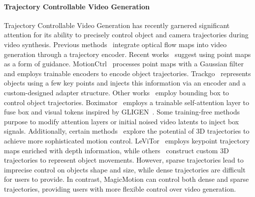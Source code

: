 \paragraph{Trajectory Controllable Video Generation}
Trajectory Controllable Video Generation has recently garnered significant attention for its ability to precisely control object and camera trajectories during video synthesis.
Previous methods~\cite{yin2023dragnuwa, zhang2025tora, shi2024motion, li2025image}
integrate optical flow maps into video generation through a trajectory encoder.
Recent works~\cite{wang2024motionctrl, zhou2025trackgo} suggest using point maps as a form of guidance.
MotionCtrl~\cite{wang2024motionctrl} processes point maps with a Gaussian filter and employs trainable encoders to encode object trajectories. Trackgo~\cite{zhou2025trackgo} represents objects using a few key points and injects this information via an encoder and a custom-designed adapter structure.
Other works~\cite{wang2024boximator,qiu2024freetraj, namekata2024sgi2v, jain2023peekaboo} employ bounding box to control object trajectories. Boximator~\cite{wang2024boximator} employs a trainable self-attention layer to fuse box and visual tokens inspired by GLIGEN~\cite{li2023gligen}. Some training-free methods~\cite{qiu2024freetraj, namekata2024sgi2v, jain2023peekaboo} purpose to modify attention layers or initial noised video latents to inject box signals.
Additionally, certain methods~\cite{wang2025cinemaster, gu2025das, fu20243dtrajmaster,wang2025levitor} explore the potential of 3D trajectories to achieve more sophisticated motion control. LeViTor~\cite{wang2025levitor} employs keypoint trajectory maps enriched with depth information, while others~\cite{wang2025cinemaster, gu2025das, fu20243dtrajmaster} construct custom 3D trajectories to represent object movements.
However, sparse trajectories lead to imprecise control on objects shape and size, while dense trajectories are difficult for users to provide.
In contrast, MagicMotion can control both dense and sparse trajectories, providing users with more flexible control over video generation.